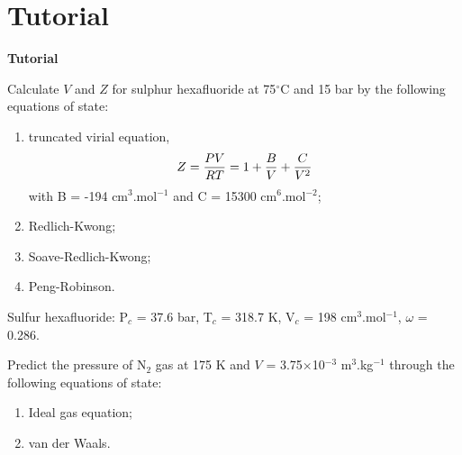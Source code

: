\clearpage
\section{Tutorial}
\begin{MyTutorial}{\begin{center}{\bf Tutorial}\end{center}}
%
  \begin{problem}\label{Tut03:EOS1} %
     Calculate $V$ and $Z$ for sulphur hexafluoride at 75$^{\circ}$C and 15 bar by the following equations of state:
        \begin{enumerate}
          \item truncated virial equation,
             \begin{displaymath}
                Z = \displaystyle\frac{PV}{RT} = 1 + \displaystyle\frac{B}{V} + \displaystyle\frac{C}{V^{2}}
             \end{displaymath}
             with B = -194 cm$^{3}$.mol$^{-1}$ and C = 15300 cm$^{6}$.mol$^{-2}$;
          \item Redlich-Kwong;
          \item Soave-Redlich-Kwong;
          \item Peng-Robinson.
        \end{enumerate}
     Sulfur hexafluoride: P$_{c}$ = 37.6 bar, T$_{c}$ = 318.7 K, V$_{c}$ = 198 cm$^{3}$.mol$^{-1}$, $\omega$ = 0.286.
  \end{problem}
%
  \begin{problem}\label{Tut03:EOS2} %
     Predict the pressure of N$_{2}$ gas at 175 K and $V$ = 3.75$\times$10$^{-3}$ m$^{3}$.kg$^{-1}$ through the following equations of state:
        \begin{enumerate}
          \item Ideal gas equation;
          \item van der Waals.

\end{enumerate}
\end{problem}
\end{MyTutorial}
